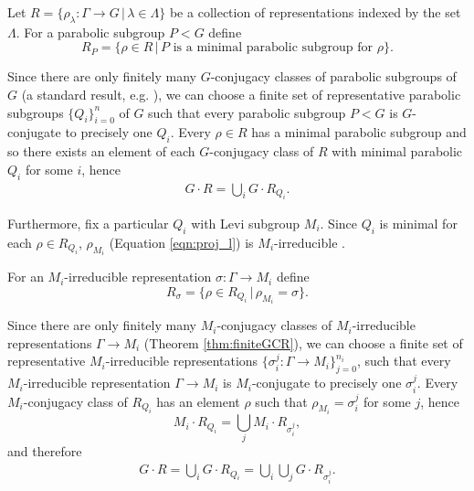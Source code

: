 Let $R = \{ \rho_\lambda : \Gamma \rightarrow G \,|\, \lambda \in \Lambda \}$ be a collection of representations indexed by the set $\Lambda$. For a parabolic subgroup $P < G$ define
\begin{displaymath}
  R_P = \{ \rho \in R \,|\, P \textrm{ is a minimal parabolic subgroup for } \rho \}.
\end{displaymath}

Since there are only finitely many $G$-conjugacy classes of parabolic subgroups of $G$ (a standard result, e.g. \cite[Theorem 30.1(a)]{humphreys1975linear}), we can choose a finite set of representative parabolic subgroups $\{Q_i\}_{i = 0}^n$ of $G$ such that every parabolic subgroup $P < G$ is $G$-conjugate to precisely one $Q_i$. Every $\rho \in R$ has a minimal parabolic subgroup and so there exists an element of each $G$-conjugacy class of $R$ with minimal parabolic $Q_i$ for some $i$, hence
\begin{eqnarray}
  G \cdot R = \bigcup_i G \cdot R_{Q_i}.
  \label{eqn:gr_gqi}
\end{eqnarray}

Furthermore, fix a particular $Q_i$ with Levi subgroup $M_i$. Since $Q_i$ is minimal for each $\rho \in R_{Q_i}$, $\rho_{M_i}$ (Equation \ref{eqn:proj_l}) is $M_i$-irreducible \cite[Lemma 6.2(ii)]{bate2005geometric}.

For an $M_i$-irreducible representation $\sigma : \Gamma \rightarrow M_i$ define
\begin{displaymath}
  R_{\sigma} = \{ \rho \in R_{Q_i} \,|\, \rho_{M_i} = \sigma \}.
\end{displaymath}

Since there are only finitely many $M_i$-conjugacy classes of $M_i$-irreducible representations $\Gamma \rightarrow M_i$ (Theorem \ref{thm:finiteGCR}), we can choose a finite set of representative $M_i$-irreducible representations $\{\sigma_i^j : \Gamma \rightarrow M_i \}_{j=0}^{n_i}$, such that every $M_i$-irreducible representation $\Gamma \rightarrow M_i$ is $M_i$-conjugate to precisely one $\sigma_i^j$. Every $M_i$-conjugacy class of $R_{Q_i}$ has an element $\rho$ such that $\rho_{M_i} = \sigma_i^j$ for some $j$, hence
\begin{displaymath}
  M_i \cdot R_{Q_i} = \bigcup_j M_i \cdot R_{\sigma_i^j},
\end{displaymath}
and therefore
\begin{eqnarray}
  G \cdot R = \bigcup_i G \cdot R_{Q_i} = \bigcup_i \bigcup_j G \cdot R_{\sigma_i^j}.
  \label{eqn:gr_grsigma}
\end{eqnarray}


